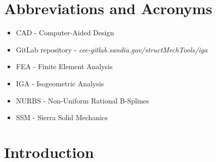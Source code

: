 \documentclass[12pt,report,justified]{SANDreport}
\begin{document}
\chapter*{Abbreviations and Acronyms}
\begin{itemize}
\item CAD - Computer-Aided Design
\item GitLab repository - {\em cee-gitlab.sandia.gov/structMechTools/iga}
\item FEA - Finite Element Analysis
\item IGA - Isogeometric Analysis
\item NURBS - Non-Uniform Rational B-Splines
\item SSM - Sierra Solid Mechanics
\end{itemize}

\chapter{Introduction}
\label{Intro}
\end{document}
